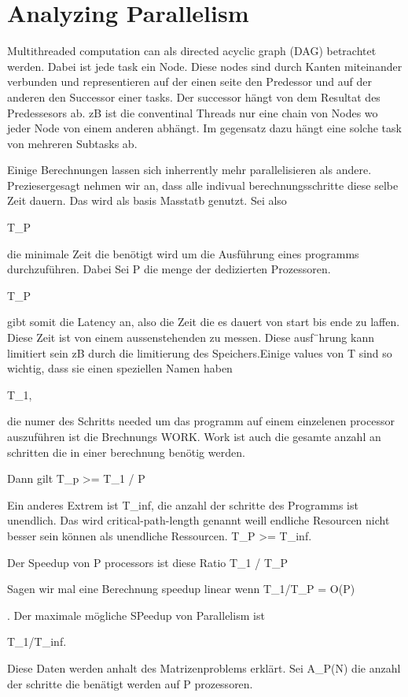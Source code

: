 \section{Analyzing Parallelism}

Multithreaded computation can als directed acyclic graph (DAG) betrachtet werden. Dabei ist jede task ein Node. Diese nodes sind durch Kanten miteinander verbunden und representieren auf der einen seite den Predessor und auf der anderen den Successor einer tasks. Der successor hängt von dem Resultat des Predessesors ab. zB ist die conventinal Threads nur eine chain von Nodes wo jeder Node von einem anderen abhängt. Im gegensatz dazu hängt eine solche task von mehreren Subtasks ab.

Einige Berechnungen lassen sich inherrently mehr parallelisieren als andere. Preziesergesagt nehmen wir an, dass alle indivual berechnungsschritte diese selbe Zeit dauern. Das wird als basis Masstatb genutzt. Sei also

T_P 

die minimale Zeit die benötigt wird um die Ausführung eines programms durchzuführen. Dabei Sei P die menge der dedizierten Prozessoren. 

T_P

 gibt somit die Latency an, also die Zeit die es dauert von start bis ende zu laffen. Diese Zeit ist von einem aussenstehenden zu messen. Diese ausf¨hrung kann limitiert sein zB durch die limitierung des Speichers.Einige values von T sind so wichtig, dass sie einen speziellen Namen haben 

 T_1,

 die numer des Schritts needed um das programm auf einem einzelenen processor auszuführen ist die Brechnungs WORK. Work ist auch die gesamte anzahl an schritten die in einer berechnung benötig werden. 

Dann gilt T_p >= T_1 / P

Ein anderes Extrem ist 
T_inf, 
die anzahl der schritte des Programms ist unendlich. Das wird critical-path-length genannt weill endliche Resourcen nicht besser sein können als unendliche Ressourcen. 
T_P >= T_inf.


Der Speedup von P processors ist diese Ratio T_1 / T_P


Sagen wir mal eine Berechnung speedup linear wenn 
T_1/T_P = O(P)

. Der maximale mögliche SPeedup von Parallelism ist 

T_1/T_inf. 

Diese Daten werden anhalt des Matrizenproblems erklärt. Sei A_P(N) die anzahl der schritte die benätigt werden auf P prozessoren. 


